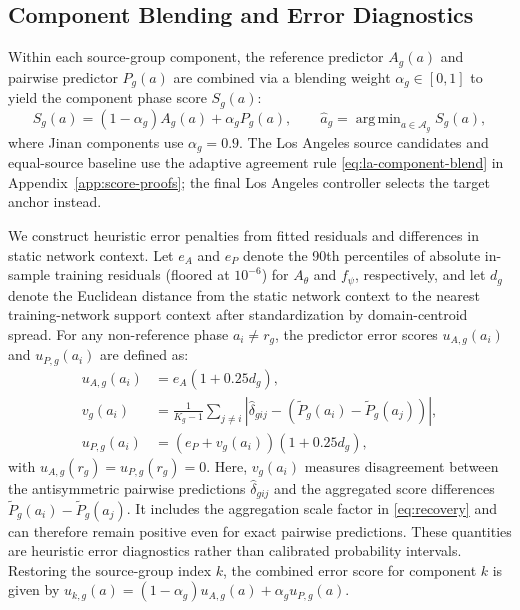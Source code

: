\documentclass[letterpaper,journal]{IEEEtran}
\DeclareMathOperator*{\argmin}{arg\,min}
\begin{document}
\subsection{Component Blending and Error Diagnostics}
Within each source-group component, the reference predictor $A_g(a)$ and pairwise predictor $P_g(a)$ are combined via a blending weight $\alpha_g \in [0, 1]$ to yield the component phase score $S_g(a)$:
\begin{equation}
 S_g(a)=(1-\alpha_g)A_g(a)+\alpha_gP_g(a),\qquad
 \widehat a_g=\argmin_{a\in\mathcal A_g}S_g(a),
 \label{eq:blend}
\end{equation}
where Jinan components use $\alpha_g=0.9$. The Los Angeles source candidates and equal-source baseline use the adaptive agreement rule \eqref{eq:la-component-blend} in Appendix~\ref{app:score-proofs}; the final Los Angeles controller selects the target anchor instead.

We construct heuristic error penalties from fitted residuals and differences in static network context. Let $e_A$ and $e_P$ denote the 90th percentiles of absolute in-sample training residuals (floored at $10^{-6}$) for $A_\theta$ and $f_\psi$, respectively, and let $d_g$ denote the Euclidean distance from the static network context to the nearest training-network support context after standardization by domain-centroid spread. For any non-reference phase $a_i \ne r_g$, the predictor error scores $u_{A,g}(a_i)$ and $u_{P,g}(a_i)$ are defined as:
\begin{align}
 u_{A,g}(a_i)&=e_A(1+0.25d_g),\nonumber\\
 v_g(a_i)&=\frac{1}{K_g-1}\sum_{j\ne i}
 \left|\widehat\delta_{gij}-(\widetilde P_g(a_i)-\widetilde P_g(a_j))\right|,\nonumber\\
 u_{P,g}(a_i)&=(e_P+v_g(a_i))(1+0.25d_g),
 \label{eq:error_scores}
\end{align}
with $u_{A,g}(r_g)=u_{P,g}(r_g)=0$. Here, $v_g(a_i)$ measures disagreement between the antisymmetric pairwise predictions $\widehat\delta_{gij}$ and the aggregated score differences $\widetilde P_g(a_i)-\widetilde P_g(a_j)$. It includes the aggregation scale factor in \eqref{eq:recovery} and can therefore remain positive even for exact pairwise predictions. These quantities are heuristic error diagnostics rather than calibrated probability intervals. Restoring the source-group index $k$, the combined error score for component $k$ is given by $u_{k,g}(a)=(1-\alpha_g)u_{A,g}(a)+\alpha_gu_{P,g}(a)$.
\end{document}
